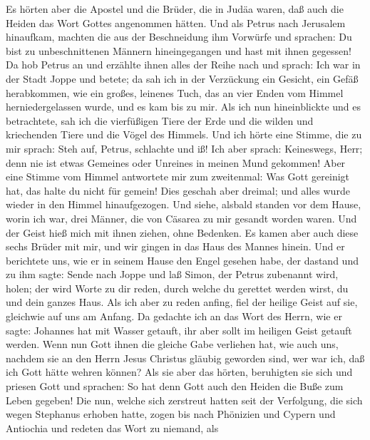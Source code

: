  Es hörten aber die Apostel und die Brüder, die in Judäa
waren, daß auch die Heiden das Wort Gottes angenommen hätten.
 Und als Petrus nach Jerusalem hinaufkam, machten die aus
der Beschneidung ihm Vorwürfe und sprachen:  Du bist zu
unbeschnittenen Männern hineingegangen und hast mit ihnen gegessen!
 Da hob Petrus an und erzählte ihnen alles der Reihe nach
und sprach:  Ich war in der Stadt Joppe und betete; da sah
ich in der Verzückung ein Gesicht, ein Gefäß herabkommen, wie ein
großes, leinenes Tuch, das an vier Enden vom Himmel herniedergelassen
wurde, und es kam bis zu mir.  Als ich nun hineinblickte
und es betrachtete, sah ich die vierfüßigen Tiere der Erde und die
wilden und kriechenden Tiere und die Vögel des Himmels. 
Und ich hörte eine Stimme, die zu mir sprach: Steh auf, Petrus,
schlachte und iß!  Ich aber sprach: Keineswegs, Herr; denn
nie ist etwas Gemeines oder Unreines in meinen Mund gekommen!
 Aber eine Stimme vom Himmel antwortete mir zum
zweitenmal: Was Gott gereinigt hat, das halte du nicht für gemein!
 Dies geschah aber dreimal; und alles wurde wieder in den
Himmel hinaufgezogen.  Und siehe, alsbald standen vor dem
Hause, worin ich war, drei Männer, die von Cäsarea zu mir gesandt worden
waren.  Und der Geist hieß mich mit ihnen ziehen, ohne
Bedenken. Es kamen aber auch diese sechs Brüder mit mir, und wir gingen
in das Haus des Mannes hinein.  Und er berichtete uns,
wie er in seinem Hause den Engel gesehen habe, der dastand und zu ihm
sagte: Sende nach Joppe und laß Simon, der Petrus zubenannt wird, holen;
 der wird Worte zu dir reden, durch welche du gerettet
werden wirst, du und dein ganzes Haus.  Als ich aber zu
reden anfing, fiel der heilige Geist auf sie, gleichwie auf uns am
Anfang.  Da gedachte ich an das Wort des Herrn, wie er
sagte: Johannes hat mit Wasser getauft, ihr aber sollt im heiligen Geist
getauft werden.  Wenn nun Gott ihnen die gleiche Gabe
verliehen hat, wie auch uns, nachdem sie an den Herrn Jesus Christus
gläubig geworden sind, wer war ich, daß ich Gott hätte wehren können?
 Als sie aber das hörten, beruhigten sie sich und priesen
Gott und sprachen: So hat denn Gott auch den Heiden die Buße zum Leben
gegeben!  Die nun, welche sich zerstreut hatten seit der
Verfolgung, die sich wegen Stephanus erhoben hatte, zogen bis nach
Phönizien und Cypern und Antiochia und redeten das Wort zu niemand, als
